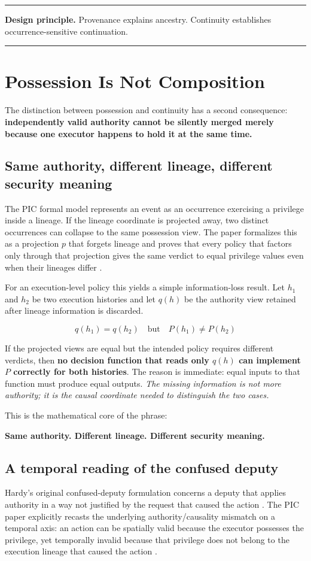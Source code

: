 \documentclass[10pt,oneside,openany]{book}
\newcommand{\principle}[1]{%
  \vspace{4pt}
  \noindent\begin{minipage}{\linewidth}
  \hrule\vspace{5pt}
  \small\sffamily\raggedright\textbf{Design principle.} #1
  \vspace{5pt}\hrule
  \end{minipage}\vspace{4pt}
}
\begin{document}
\principle{Provenance explains ancestry. Continuity establishes occurrence-sensitive continuation.}

\chapter{Possession Is Not Composition}

The distinction between possession and continuity has a second consequence: \textbf{independently valid authority cannot be silently merged merely because one executor happens to hold it at the same time.}

\section{Same authority, different lineage, different security meaning}
The PIC formal model represents an event as an occurrence exercising a privilege inside a lineage. If the lineage coordinate is projected away, two distinct occurrences can collapse to the same possession view. The paper formalizes this as a projection $p$ that forgets lineage and proves that every policy that factors only through that projection gives the same verdict to equal privilege values even when their lineages differ \cite{gallo2026pic}.

For an execution-level policy this yields a simple information-loss result. Let $h_1$ and $h_2$ be two execution histories and let $q(h)$ be the authority view retained after lineage information is discarded.
\begin{formulabox}
\[
q(h_1)=q(h_2)
\quad\text{but}\quad
P(h_1)\neq P(h_2)
\]
\end{formulabox}
If the projected views are equal but the intended policy requires different verdicts, then \textbf{no decision function that reads only $q(h)$ can implement $P$ correctly for both histories}. The reason is immediate: equal inputs to that function must produce equal outputs. \emph{The missing information is not more authority; it is the causal coordinate needed to distinguish the two cases.}

This is the mathematical core of the phrase:
\begin{center}
\sffamily\bfseries
Same authority. Different lineage. Different security meaning.
\end{center}

\section{A temporal reading of the confused deputy}
Hardy's original confused-deputy formulation concerns a deputy that applies authority in a way not justified by the request that caused the action \cite{hardy1988}. The PIC paper explicitly recasts the underlying authority/causality mismatch on a temporal axis: an action can be spatially valid because the executor possesses the privilege, yet temporally invalid because that privilege does not belong to the execution lineage that caused the action \cite{gallo2026pic}.
\end{document}
